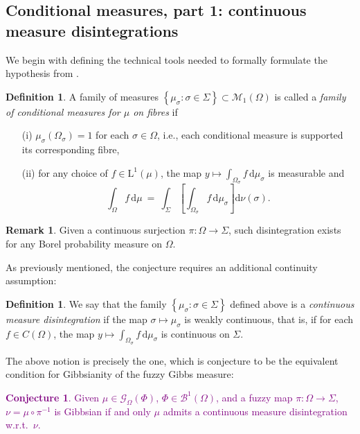 \documentclass[12pt]{article}
\newcommand{\BB}{\mathscr{B}}
\renewcommand{\d}{\mathrm{d}}
\newcommand{\G}{\mathcal{G}}
\newcommand{\M}{\mathcal{M}}
\newcommand{\set}[1]{\left\{#1\right\}}
\newcommand{\oglati}[1]{\left[#1\right]}
\newcommand{\ra}{\rightarrow}
\newcommand{\1}{\mathbbm{1}}
\newcommand{\5}{\vspace{0.5cm}}
\theoremstyle{definition}
\newtheorem{df}[thm]{Definition}
\newtheorem{rem}[thm]{Remark}
\newtheorem{conj}[thm]{Conjecture}
\begin{document}

\subsection{Conditional measures, part 1: continuous measure disintegrations}\label{sec:2.2}

We begin with defining the technical tools needed to formally formulate the hypothesis from \cite{EFS}.

\begin{df}\label{def:MeasureDisint}
A family of measures $\set{\mu_\sigma:\sigma\in\Sigma}\subset\M_1(\Omega)$ is called a \textit{family of conditional measures for $\mu$ on fibres} if
\begin{itemize}
	\item[(i)] $\mu_\sigma(\Omega_\sigma)=1$ for each $\sigma\in\Omega$, i.e., each conditional measure is supported its corresponding fibre,
	\item[(ii)] for any choice of $f\in\mathrm{L}^1(\mu)$, the map $y\mapsto\int_{\Omega_\sigma} f\,\d\mu_\sigma$ is measurable and
	$$\int_\Omega f\,\d\mu ~=~ \int_{\Sigma}\!\oglati{\int_{\Omega_\sigma} f\,\d\mu_\sigma}\!\d\nu(\sigma).$$
\end{itemize}
\end{df}

\begin{rem}
Given a continuous surjection $\pi:\Omega\ra\Sigma$, such disintegration exists for any Borel probability measure on $\Omega$.
\end{rem}

As previously mentioned, the conjecture requires an additional continuity assumption:

\begin{df}
We say that the family $\set{\mu_\sigma:\sigma\in\Sigma}$ defined above is a \textit{continuous measure disintegration} if the map $\sigma\mapsto\mu_\sigma$ is weakly continuous, that is, if for each $f\in C(\Omega)$, the map $y\mapsto\int_{\Omega_\sigma}f\,\d\mu_\sigma$ is continuous on $\Sigma$.
\end{df}

The above notion is precisely the one, which is conjecture to be the equivalent condition for Gibbsianity of the fuzzy Gibbs measure:
\textcolor{purple}{
\begin{conj}\label{vEFShypothesis}
Given $\mu\in\G_\Omega(\Phi)$, $\Phi\in\BB^1(\Omega)$, and a fuzzy map $\pi:\Omega\ra\Sigma$, $\nu=\mu\circ\pi^{-1}$ is Gibbsian if and only $\mu$ admits a continuous measure disintegration w.r.t.~$\nu$.
\end{conj}}
\end{document}
